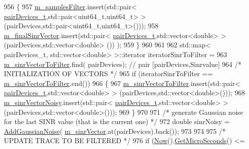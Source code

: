 \begin{DoxyCode}
956                         \{               
957                                 \hyperlink{classns3_1_1MmWaveEnbPhy_afee86fc55fdcef25ada2042be5740c62}{m\_samplesFilter}.insert(std::pair<
      \hyperlink{namespacens3_abe460b1ad735ce7c8e408857371b87af}{pairDevices\_t},std::pair<uint64\_t,uint64\_t> >(pairDevices,std::pair<uint64\_t,uint64\_t>())); 
958                                 \hyperlink{classns3_1_1MmWaveEnbPhy_a6c34c832c1bcb05fab00a4435cc499d0}{m\_finalSinrVector}.insert(std::pair<
      \hyperlink{namespacens3_abe460b1ad735ce7c8e408857371b87af}{pairDevices\_t},std::vector<double> > (pairDevices,std::vector<double> ()) );
959                         \}
960                         
961                         
962                         std::map< pairDevices\_t, std::vector<double> >::iterator iteratorSinrToFilter =
963                                                          \hyperlink{classns3_1_1MmWaveEnbPhy_a2887e6ce935c6d25fc2759269b811bbe}{m\_sinrVectorToFilter}.find(
      pairDevices); \textcolor{comment}{// pair [pairDevices,Sinrvalue] }
964                         \textcolor{comment}{/* INITIALIZATION OF VECTORS */}
965                         \textcolor{keywordflow}{if} (iteratorSinrToFilter == \hyperlink{classns3_1_1MmWaveEnbPhy_a2887e6ce935c6d25fc2759269b811bbe}{m\_sinrVectorToFilter}.end())
966                         \{
967                                 \hyperlink{classns3_1_1MmWaveEnbPhy_a2887e6ce935c6d25fc2759269b811bbe}{m\_sinrVectorToFilter}.insert(std::pair<
      \hyperlink{namespacens3_abe460b1ad735ce7c8e408857371b87af}{pairDevices\_t},std::vector<double> > (pairDevices,std::vector<double>()));
968                                 \hyperlink{classns3_1_1MmWaveEnbPhy_a796cebfd5468736861afc539d2ec4098}{m\_sinrVectorNoisy}.insert(std::pair<
      \hyperlink{namespacens3_abe460b1ad735ce7c8e408857371b87af}{pairDevices\_t},std::vector<double> > (pairDevices,std::vector<double>()));
969                         \}       
970 
971                         \textcolor{comment}{/* generate Gaussian noise for the last SINR value (that is the current one) */}
972                         \textcolor{keywordtype}{double} sinrNoisy = \hyperlink{classns3_1_1MmWaveEnbPhy_a5c2d760ae23133aae1b22b513a864192}{AddGaussianNoise}(
      \hyperlink{classns3_1_1MmWaveEnbPhy_a9e1e37ef62d54fbfc28bfd829e78f239}{m\_sinrVector}.at(pairDevices).back());  
973 
974 
975                         \textcolor{comment}{/* UPDATE TRACE TO BE FILTERED */}
976                         \textcolor{keywordflow}{if} (\hyperlink{group__simulator_gac3635e2e87f7ce316c89290ee1b01d0d}{Now}().\hyperlink{classns3_1_1Time_a2542b9273c336da11fcaf54e8bc6e4c8}{GetMicroSeconds}() <= 

\end{DoxyCode}

